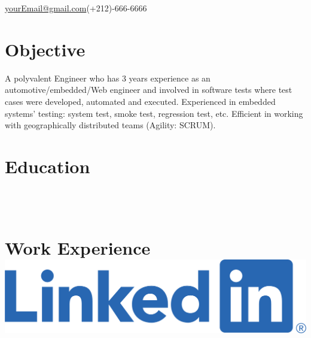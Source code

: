 \documentclass{my_cv}
\begin{document}
 {\href{mailto:yourEmail@gmail.com}{yourEmail@gmail.com}}{(+212)-666-6666}



\section{Objective}
\hspace{1pt}\parbox{0.99\textwidth}{
A polyvalent Engineer who has 3 years experience as an automotive/embedded/Web engineer and 
involved in software tests where test cases were developed, automated and 
executed. Experienced in embedded systems’ testing: system test, smoke test, 
regression test, etc. Efficient in working with geographically distributed 
teams (Agility: SCRUM).
}

\vspace{-7pt}


\section{Education}

\\
\vspace{3pt}
 \\



\vspace{-7pt}
\section{Work Experience \hfill  {\small \href{https://www.linkedin.com/feed/}{\includegraphics[scale=0.075]{LI-Logo.png}}}}
\end{document}
